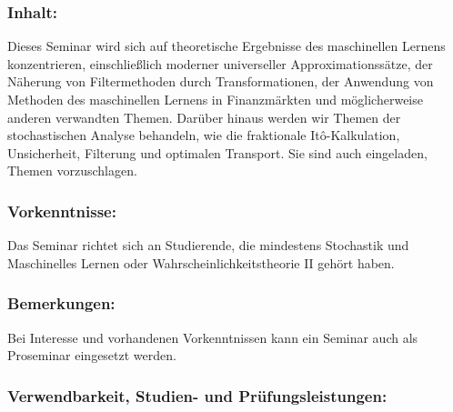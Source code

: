 \documentclass[a4paper,10pt]{article}
\begin{document}
\subsubsection*{\large
    Inhalt:
}
Dieses Seminar wird sich auf theoretische Ergebnisse des maschinellen Lernens konzentrieren, einschließlich moderner universeller Approximationssätze, der Näherung von Filtermethoden durch Transformationen, der Anwendung von Methoden des maschinellen Lernens in Finanzmärkten und möglicherweise anderen verwandten Themen. Darüber hinaus werden wir Themen der stochastischen Analyse behandeln, wie die fraktionale Itô-Kalkulation, Unsicherheit, Filterung und optimalen Transport. Sie sind auch eingeladen, Themen vorzuschlagen.
\subsubsection*{\large
    Vorkenntnisse:
}
Das Seminar richtet sich an Studierende, die mindestens Stochastik und Maschinelles Lernen oder Wahrscheinlichkeitstheorie II gehört haben.
\subsubsection*{\large
    Bemerkungen:
}
Bei Interesse und vorhandenen Vorkenntnissen kann ein Seminar auch als Proseminar eingesetzt werden.
\cleardoublepage
\subsubsection*{\large
    Verwendbarkeit, Studien- und Prüfungsleistungen:
}
\end{document}
